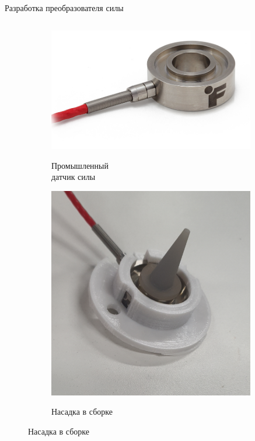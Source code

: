 \documentclass[aspectratio=169,xcolor=table]{beamer}
\begin{document}
\begin{frame}[t]{Разработка преобразователя силы}
\begin{columns}[T,onlytextwidth]
\begin{column}{0.39\textwidth}
            \begin{figure}[H]
                \begin{subfigure}[t]{0.6\textwidth}
                    \centering\includegraphics[width=0.99\textwidth]{LTH350-DONUT-LOAD-CELL-1.png}\\
                    \caption*{\normalsize Промышленный \\ датчик силы}
                    \label{fig:futek}
                \end{subfigure}
                \vspace{-0.2cm}

                \begin{subfigure}[t]{0.6\textwidth}
                    \centering\includegraphics[width=0.99\textwidth]{point_load.JPG}\\
                    \caption*{\normalsize Насадка в сборке}
                    \label{fig:point_load}
                \end{subfigure}
            \end{figure}


\end{column}
\end{columns}
\end{frame}
\end{document}

